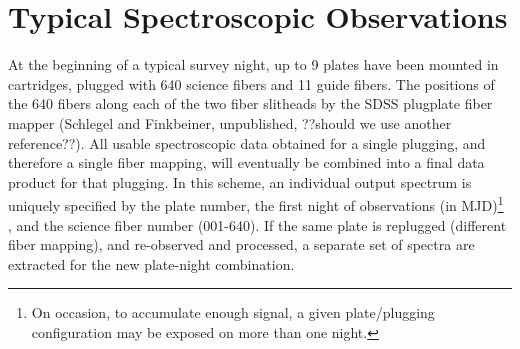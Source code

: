 \documentclass[12pt,preprint]{aastex}
\begin{document}
\section{Typical Spectroscopic Observations}
\label{sec_observ}

At the beginning of a typical survey night, up to 9 plates have been mounted
in cartridges, plugged with 640 science fibers and 11 guide fibers. 
The positions of the 640 fibers along each of the two fiber slitheads
by 
the SDSS plugplate fiber mapper (Schlegel and Finkbeiner, unpublished, ??should we use another reference??).
All usable spectroscopic data obtained for a single plugging, 
and therefore a single fiber mapping, will eventually be combined into 
a final data product for that plugging.  In this scheme, an individual 
output spectrum is uniquely specified by the plate number, the first night
of observations (in MJD)\footnote{On occasion, to accumulate enough signal, a given
plate/plugging configuration may be exposed on more than one night.} 
, and the science fiber number (001-640).  If the same plate is replugged 
(different fiber mapping), and re-observed and processed, 
a separate set of spectra are extracted for the new plate-night combination.
\end{document}
